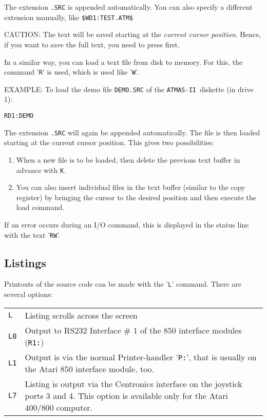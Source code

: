 \documentclass[10pt,a4paper,twoside,final,openright,titlepage]{memoir}
\def\atmas{\texttt{AT\-MAS-II }}
\newcommand{\key}[1]{\keystroke{\tiny #1}}
\begin{document}
The extension \texttt{.SRC} is appended automatically.
You can also specify a different extension manually, like
\texttt{\$WD1:TEST.ATM\$} \key{ESC}

CAUTION: The text will be saved starting at the
	\emph{current cursor position}. Hence, if you want to save
	the full text, you need to press \key{CTRL-E} first.

In a similar way, you can load a text file from disk to memory.
For this, the command '\texttt{R}' is used, which is used like '\texttt{W}'.

EXAMPLE: To load the demo file \texttt{DEMO.SRC} of the \atmas diskette
(in drive 1):

\par
\bigskip
\key{ESC}\texttt{RD1:DEMO}\key{ESC}\key{ESC}
\par
\bigskip

The extension \texttt{.SRC} will again be appended automatically.
The file is then loaded starting at the current cursor position.
This gives two possibilities:

\begin{enumerate}
\item When a new file is to be loaded, then delete the previous 
text buffer in advance with \key{ESC}\texttt{K}\key{ESC}\key{ESC}.

\item You can also insert individual files in the text buffer
(similar to the copy register) by bringing the cursor to the desired position
and then execute the load command.
\end{enumerate}

If an error occurs during an I/O command, this is displayed in the status line
with the text '\texttt{RW}'.

\subsection{Listings}

Printouts of the source code can be made with the '\texttt{L}' command.
There are several options:

\begin{tabular}{lp{25em}}
\texttt{L}  & 	Listing scrolls across the screen \\
\texttt{L0} & 	Output to RS232 Interface \# 1 of the 850 interface modules (\texttt{R1:}) \\
\texttt{L1} & 	Output is via the normal Printer-handler '\texttt{P:}', that is usually on the Atari 850 interface module, too.\\
\texttt{L7} & 	Listing is output via the Centronics interface on the joystick ports 3 and 4.
				This option is available only for the Atari 400/800 computer. \\
\end{tabular}
\end{document}
